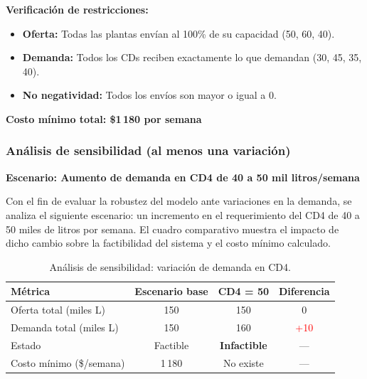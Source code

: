 \documentclass[12pt,a4paper]{article}
\begin{document}
\noindent\textbf{Verificaci\'{o}n de restricciones:}

\begin{itemize}
  \item \textbf{Oferta:} Todas las plantas env\'{i}an al 100\% de su capacidad (50, 60, 40).
  \item \textbf{Demanda:} Todos los CDs reciben exactamente lo que demandan (30, 45, 35, 40).
  \item \textbf{No negatividad:} Todos los env\'{i}os son mayor o igual a 0.
\end{itemize}

\begin{cajares}
\textbf{Costo m\'{i}nimo total: \$1\,180 por semana}
\end{cajares}

\subsubsection{An\'{a}lisis de sensibilidad (al menos una variaci\'{o}n)}

\noindent\textbf{Escenario: Aumento de demanda en CD4 de 40 a 50 mil litros/semana}

Con el fin de evaluar la robustez del modelo ante variaciones en la demanda, 
se analiza el siguiente escenario: un incremento en el requerimiento del CD4 de 40 a 50 
miles de litros por semana. El cuadro comparativo muestra el impacto de dicho cambio sobre 
la factibilidad del sistema y el costo m\'{i}nimo calculado.

\begin{table}[H]
  \centering
  \begin{tabular}{|l|c|c|c|}
    \hline
    \rowcolor{azulClaro}
    \textbf{M\'{e}trica} & \textbf{Escenario base} & \textbf{CD4 = 50} & \textbf{Diferencia} \\
    \hline
    Oferta total (miles L)     & 150 & 150 & 0 \\
    Demanda total (miles L)    & 150 & 160 & \textcolor{red}{+10} \\
    Estado                     & Factible & \textbf{Infactible} & --- \\
    Costo m\'{i}nimo (\$/semana)   & 1\,180 & No existe & --- \\
    \hline
  \end{tabular}
  \caption{An\'{a}lisis de sensibilidad: variaci\'{o}n de demanda en CD4.}
\end{table}
\end{document}
